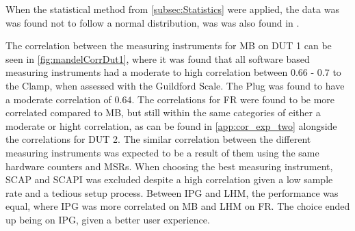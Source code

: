 When the statistical method from \cref{subsec:Statistics} were applied, the data was was found not to follow a normal distribution, was was also found in \cite{biksbois, Koedijk2022diff}.%


The correlation between the measuring instruments for MB on DUT 1 can be seen in \cref{fig:mandelCorrDut1}, where it was found that all software based measuring instruments had a moderate to high correlation between $0.66$ - $0.7$ to the Clamp, when assessed with the Guildford Scale. The Plug was found to have a moderate correlation of $0.64$. The correlations for FR were found to be more correlated compared to MB, but still within the same categories of either a moderate or hight correlation, as can be found in \cref{app:cor_exp_two} alongside the correlations for DUT 2. The similar correlation between the different measuring instruments was expected to be a result of them using the same hardware counters and MSRs. When choosing the best measuring instrument, SCAP and SCAPI was excluded despite a high correlation given a low sample rate and a tedious setup process. Between IPG and LHM, the performance was equal, where IPG was more correlated on MB and LHM on FR. The choice ended up being on IPG, given a better user experience. 


